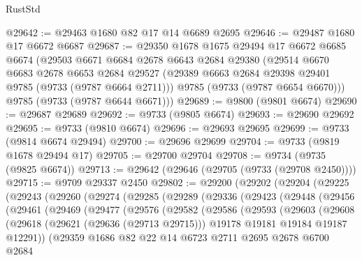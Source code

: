 \begin{lexlean}{RustStd}
\begin{coremodule}
{\begin{coremodule}
{{{{{{{{{{{{{{{{{{{{{{{{{{{{{{{{{{{{{{{{{{{{{{{{{{{{{{{@29642 := @29463 @1680 @82 @17 @14 @6689 @2695
@29646 := @29487 @1680 @17 @6672 @6687
@29687 := @29350
    @1678
    @1675
    @29494
    @17
    @6672
    @6685
    @6674
    (@29503
      @6671
      @6684
      @2678
      @6643
      @2684
      @29380
      (@29514
        @6670
        @6683
        @2678
        @6653
        @2684
        @29527
        (@29389 @6663 @2684 @29398 @29401 @9785 (@9733 (@9787 @6664 @2711)))
        @9785
        (@9733 (@9787 @6654 @6670)))
      @9785
      (@9733 (@9787 @6644 @6671)))
@29689 := @9800 (@9801 @6674)
@29690 := @29687 @29689
@29692 := @9733 (@9805 @6674)
@29693 := @29690 @29692
@29695 := @9733 (@9810 @6674)
@29696 := @29693 @29695
@29699 := @9733 (@9814 @6674 @29494)
@29700 := @29696 @29699
@29704 := @9733 (@9819 @1678 @29494 @17)
@29705 := @29700 @29704
@29708 := @9734 (@9735 (@9825 @6674))
@29713 := @29642 (@29646 (@29705 (@9733 (@29708 @2450))))
@29715 := @9709 @29337 @2450
@29802 := @29200
    (@29202
      (@29204
        (@29225
          (@29243
            (@29260
              (@29274
                (@29285
                  (@29289
                    (@29336
                      (@29423
                        (@29448
                          (@29456
                            (@29461
                              (@29469
                                (@29477
                                  (@29576
                                    (@29582
                                      (@29586
                                        (@29593
                                          (@29603
                                            (@29608
                                              (@29618
                                                (@29621 (@29636 (@29713 @29715)))
                                                @19178
                                                @19181
                                                @19184
                                                @19187
                                                @12291))
                                            (@29359
                                              @1686
                                              @82
                                              @22
                                              @14
                                              @6723
                                              @2711
                                              @2695
                                              @2678
                                              @6700
                                              @2684
}}}}}}}}}}}}}}}}}}}}}}}}}}}}}}}}}}}}}}}}}}}}}}}}}}}}}}}
\end{coremodule}}
\end{coremodule}
\end{lexlean}
